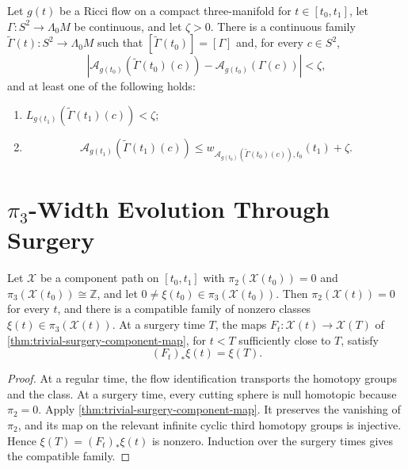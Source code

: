 \begin{theorem}
\label{thm:controlled-loop-family-deformation}
\notready
Let $g(t)$ be a Ricci flow on a compact three-manifold for
$t\in[t_0,t_1]$, let $\Gamma\colon S^2\to\Lambda_0M$ be continuous, and
let $\zeta>0$.  There is a continuous family
$\widetilde\Gamma(t)\colon S^2\to\Lambda_0M$ such that
$[\widetilde\Gamma(t_0)]=[\Gamma]$ and, for every $c\in S^2$,
\[
 |\mathcal A_{g(t_0)}(\widetilde\Gamma(t_0)(c))
   -\mathcal A_{g(t_0)}(\Gamma(c))|<\zeta,
\]
and at least one of the following holds:
\begin{enumerate}
\item $L_{g(t_1)}(\widetilde\Gamma(t_1)(c))<\zeta$;
\item
\[
 \mathcal A_{g(t_1)}(\widetilde\Gamma(t_1)(c))
 \le w_{\mathcal A_{g(t_0)}(\widetilde\Gamma(t_0)(c)),t_0}(t_1)+\zeta.
\]
\end{enumerate}
\end{theorem}

\section{\texorpdfstring{$\pi_3$}{pi3}-Width Evolution Through Surgery}

\begin{theorem}
\label{thm:surgery-pi3-class-transport}
\notready
Let $\mathcal X$ be a component path on $[t_0,t_1]$ with
$\pi_2(\mathcal X(t_0))=0$ and
$\pi_3(\mathcal X(t_0))\cong\mathbb Z$, and let
$0\ne\xi(t_0)\in\pi_3(\mathcal X(t_0))$.  Then $\pi_2(\mathcal X(t))=0$
for every $t$, and there is a compatible family of nonzero classes
$\xi(t)\in\pi_3(\mathcal X(t))$.  At a surgery time $T$, the maps
$F_t\colon\mathcal X(t)\to\mathcal X(T)$ of
\ref{thm:trivial-surgery-component-map}, for $t<T$ sufficiently close to $T$,
satisfy
\[
 (F_t)_*\xi(t)=\xi(T).
\]
\end{theorem}

\begin{proof}
At a regular time, the flow identification transports the homotopy groups and
the class.  At a surgery time, every cutting sphere is null homotopic because
$\pi_2=0$.  Apply \ref{thm:trivial-surgery-component-map}.  It preserves the
vanishing of $\pi_2$, and its map on the relevant infinite cyclic third
homotopy groups is injective.  Hence
$\xi(T)=(F_t)_*\xi(t)$ is nonzero.  Induction over the surgery times gives the
compatible family.
\end{proof}


